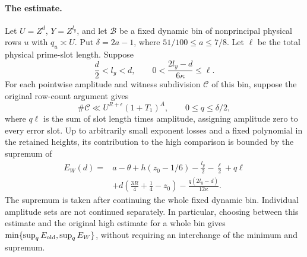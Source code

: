 \paragraph{The estimate.}
Let $U=Z^d$, $Y=Z^{l_y}$, and let $\mathcal B$ be a fixed dynamic bin of
nonprincipal physical rows $u$ with $q_u\asymp U$.  Put
$\delta=2a-1$, where $51/100\le a\le7/8$. Let $\ell$ be the total physical
prime-slot length.  Suppose
\begin{equation}\label{eq:new-capacity-supply}
 \frac d2<l_y<d,\qquad
 0<\frac{2l_y-d}{6\kappa}\le\ell.
\end{equation}
For each pointwise amplitude and witness subdivision $\mathcal C$ of
this bin, suppose the original row-count argument gives
\[
 \#\mathcal C\ll U^{R+\epsilon}(1+T_1)^A,
 \qquad 0\le q\le\delta/2,
\]
where $q\ell$ is the sum of slot length times amplitude, assigning
amplitude zero to every error slot.  Up to arbitrarily small exponent
losses and a fixed polynomial in the retained heights, its contribution
to the high comparison is bounded by the supremum of
\begin{equation}\label{eq:new-weighted-high-exponent}
 \begin{split}
 E_W(d)={}&a-\theta+h(z_0-1/6)-\frac{l_y}{2}-\frac\ell2+q\ell\\
 &+d\left(\frac{3R}{4}+\frac14-z_0\right)
       -\frac{q(2l_y-d)}{12\kappa}.
 \end{split}
\end{equation}
The supremum is taken after continuing the whole fixed dynamic bin.
Individual amplitude sets are not continued separately.  In particular,
choosing between this estimate and the original high estimate for a
whole bin gives
$\min\{\sup_q E_{\rm old},\sup_q E_W\}$, without requiring an
interchange of the minimum and supremum.

